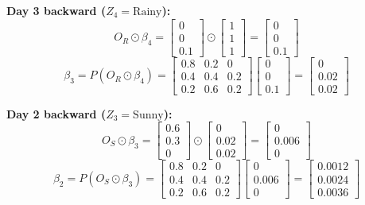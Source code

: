 \documentclass{article}
\begin{document}
\begin{enumerate}
    \textbf{Day 3 backward ($Z_4 = \text{Rainy}$):}
    $$ O_R \odot \beta_4 = \begin{bmatrix} 0 \\ 0 \\ 0.1 \end{bmatrix} \odot \begin{bmatrix} 1 \\ 1 \\ 1 \end{bmatrix} = \begin{bmatrix} 0 \\ 0 \\ 0.1 \end{bmatrix} $$
    $$ \beta_3 = P (O_R \odot \beta_4) = \begin{bmatrix} 0.8 & 0.2 & 0 \\ 0.4 & 0.4 & 0.2 \\ 0.2 & 0.6 & 0.2 \end{bmatrix} \begin{bmatrix} 0 \\ 0 \\ 0.1 \end{bmatrix} = \begin{bmatrix} 0 \\ 0.02 \\ 0.02 \end{bmatrix} $$

    \textbf{Day 2 backward ($Z_3 = \text{Sunny}$):}
    $$ O_S \odot \beta_3 = \begin{bmatrix} 0.6 \\ 0.3 \\ 0 \end{bmatrix} \odot \begin{bmatrix} 0 \\ 0.02 \\ 0.02 \end{bmatrix} = \begin{bmatrix} 0 \\ 0.006 \\ 0 \end{bmatrix} $$
    $$ \beta_2 = P (O_S \odot \beta_3) = \begin{bmatrix} 0.8 & 0.2 & 0 \\ 0.4 & 0.4 & 0.2 \\ 0.2 & 0.6 & 0.2 \end{bmatrix} \begin{bmatrix} 0 \\ 0.006 \\ 0 \end{bmatrix} = \begin{bmatrix} 0.0012 \\ 0.0024 \\ 0.0036 \end{bmatrix} $$


\end{enumerate}
\end{document}
